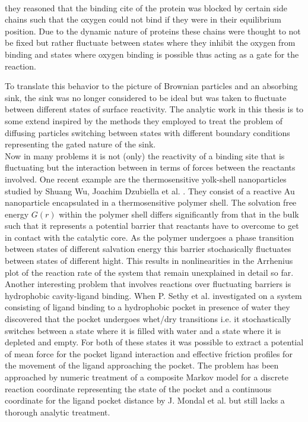 \vspace{0.3 cm} \\
they reasoned that the binding cite of the protein was blocked by certain side chains such that the oxygen could not bind if they were in their equilibrium position. Due to the dynamic nature of proteins these chains were thought to not be fixed but rather fluctuate between states where they inhibit the oxygen from binding and states where oxygen binding is possible thus acting as a gate for the reaction. \par
To translate this behavior to the picture of Brownian particles and an absorbing sink, the sink was no longer considered to be ideal but was taken to fluctuate between different states of surface reactivity. The analytic work in this thesis is to some extend inspired by the methods they employed to treat the problem of diffusing particles switching between states with different boundary conditions representing the gated nature of the sink. \\

Now in many problems it is not (only) the reactivity of a binding site that is fluctuating but the interaction between in terms of forces between the reactants involved. One recent example are the thermosensitive yolk-shell nanoparticles studied by Shuang Wu, Joachim Dzubiella et al. \cite{Wu2012a}. They consist of a reactive Au nanoparticle encapsulated in a thermosensitive polymer shell. The solvation free energy $G(r)$ within the polymer shell differs significantly from that in the bulk such that it represents a potential barrier that reactants have to overcome to get in contact with the catalytic core. As the polymer undergoes a phase transition between states of different salvation energy this barrier stochasically fluctuates between states of different hight. This results in nonlinearities in the Arrhenius plot of the reaction rate of the system that remain unexplained in detail so far.\\

Another interesting problem that involves reactions over fluctuating barriers is hydrophobic cavity-ligand binding. When P. Sethy et al. \cite{Setny2013} investigated on a system consisting of ligand binding to a hydrophobic pocket in presence of water they discovered that the pocket undergoes whet/dry transitions i.e. it stochastically switches between a state where it is filled with water and a state where it is depleted and empty. For both of these states it was possible to extract a potential of mean force for the pocket ligand interaction and effective friction profiles for the movement of the ligand approaching the pocket. The problem has been approached by numeric treatment of a composite Markov model for a discrete reaction coordinate representing the state of the pocket and a continuous coordinate for the ligand pocket distance by J. Mondal et al. \cite{Mondal2013} but still lacks a thorough analytic treatment. \\

